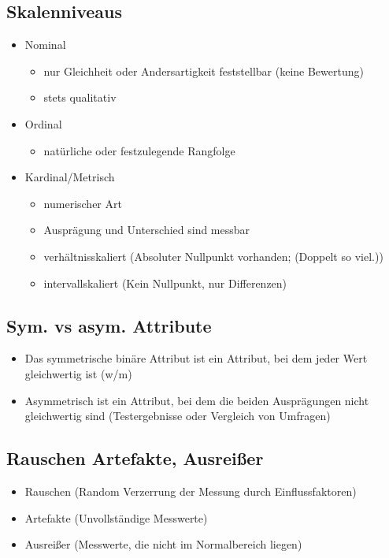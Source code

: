 \documentclass[a4paper]{article}
\begin{document}
\begin{landscape}
\begin{multicols}{3}
            \subsection{Skalenniveaus}
            \begin{itemize}[noitemsep,nolistsep]
                \item Nominal
                \begin{itemize}
                    \item nur Gleichheit oder Andersartigkeit feststellbar (keine Bewertung)
                    \item stets qualitativ
                \end{itemize}
                \item Ordinal
                \begin{itemize}
                    \item natürliche oder festzulegende Rangfolge
                \end{itemize}
                \item Kardinal/Metrisch
                \begin{itemize}
                    \item numerischer Art 
                    \item Ausprägung und Unterschied sind messbar
                    \item verhältnisskaliert (Absoluter Nullpunkt vorhanden; (Doppelt so viel.))
                    \item intervallskaliert (Kein Nullpunkt, nur Differenzen)
                \end{itemize}
            \end{itemize}
    \subsection{Sym. vs asym. Attribute}
        \begin{itemize}[noitemsep,nolistsep]
            \item Das symmetrische binäre Attribut ist ein Attribut, bei dem jeder Wert gleichwertig ist (w/m)
            \item Asymmetrisch ist ein Attribut, bei dem die beiden Ausprägungen nicht gleichwertig sind (Testergebnisse oder Vergleich von Umfragen)
        \end{itemize}

    \subsection{Rauschen Artefakte, Ausreißer}
    \begin{itemize}[noitemsep,nolistsep]
        \item Rauschen (Random Verzerrung der Messung durch Einflussfaktoren)
        \item Artefakte (Unvollständige Messwerte)
        \item Ausreißer (Messwerte, die nicht im Normalbereich liegen)
    \end{itemize}


\end{multicols}
\end{landscape}
\end{document}

